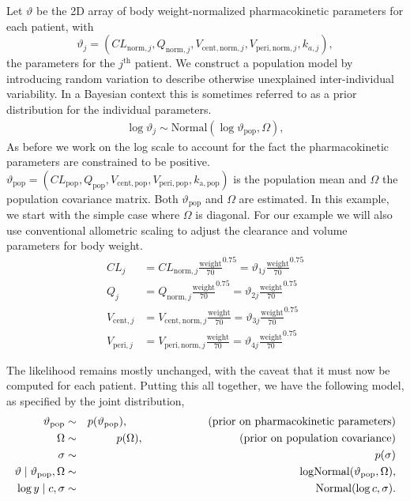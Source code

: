 Let $\vartheta$ be the 2D array of body weight-normalized pharmacokinetic parameters for each patient,
with
\begin{equation*}
  \vartheta_j = (CL_{\mathrm{norm}, j}, Q_{\mathrm{norm}, j}, V_{\mathrm{cent}, \mathrm{norm},  j}, V_{\mathrm{peri}, \mathrm{norm}, j}, k_{a, j}),
\end{equation*} 
the parameters for the $j^\mathrm{th}$ patient.
We construct a population model by introducing random
variation to describe otherwise unexplained inter-individual
variability. In a Bayesian context this is sometimes referred to as a
prior distribution for the individual parameters.
\begin{eqnarray*}
  \log \vartheta_j \sim \mathrm{Normal} (\log \vartheta_\mathrm{pop}, \Omega),
\end{eqnarray*}
As before we work on the log scale to account for the fact the pharmacokinetic parameters are constrained to be positive.
$\vartheta_\mathrm{pop} = (CL_\mathrm{pop}, Q_\mathrm{pop}, V_\mathrm{cent, pop}, V_\mathrm{peri, pop}, k_\mathrm{a, pop})$ is the population mean and $\Omega$ the population covariance matrix.
Both $\vartheta_\mathrm{pop}$ and $\Omega$ are estimated.
In this example, we start with the simple case where $\Omega$ is
diagonal.
For our example we will also use conventional allometric scaling to
adjust the clearance and volume parameters for body weight.
\begin{align*}
  CL_j &= CL_{\mathrm{norm}, j} \frac{\mathrm{weight}}{70}^{0.75} = \vartheta_{1j} \frac{\mathrm{weight}}{70}^{0.75} \\
  Q_j &= Q_{\mathrm{norm}, j} \frac{\mathrm{weight}}{70}^{0.75} = \vartheta_{2j} \frac{\mathrm{weight}}{70}^{0.75} \\
  V_{\mathrm{cent}, j} &= V_{\mathrm{cent}, \mathrm{norm},  j} \frac{\mathrm{weight}}{70} = \vartheta_{3j} \frac{\mathrm{weight}}{70}^{0.75} \\
  V_{\mathrm{peri}, j} &= V_{\mathrm{peri}, \mathrm{norm},  j} \frac{\mathrm{weight}}{70} = \vartheta_{4j} \frac{\mathrm{weight}}{70}^{0.75}
\end{align*}

The likelihood remains mostly unchanged, with the caveat that it must now be computed for each patient.
Putting this all together, we have the following model, as specified by the joint distribution,
\begin{eqnarray*}
  \vartheta_\mathrm{pop} & \sim & p(\vartheta_\mathrm{pop}), \hspace{1in} \text{(prior on pharmacokinetic parameters)} \\
  \Omega & \sim & p(\Omega), \hspace{1.2in} \text{(prior on population covariance)} \\
  \sigma & \sim & p(\sigma) \\
  \vartheta \mid \vartheta_\mathrm{pop}, \Omega  & \sim  & \mathrm{logNormal}(\vartheta_\mathrm{pop}, \Omega), \\
  \log y \mid c, \sigma & \sim & \mathrm{Normal}(\log c, \sigma).
\end{eqnarray*}

